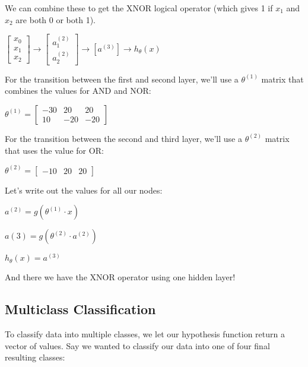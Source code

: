 \documentclass{article}
\begin{document}
We can combine these to get the XNOR logical operator (which gives 1 if $x_1$ and $x_2$ are both 0 or both 1).

$\left[\begin{matrix}
x_0 \\
x_1 \\
x_2
\end{matrix}\right]
\to
\left[ \begin{matrix}
a_1^{(2)} \\
a_2^{(2)}
\end{matrix}\right]
\to
\left[a^{(3)} \right]
\to 
h_{\theta}(x)
$

For the transition between the first and second layer, we'll use a $\theta^{(1)}$ matrix that combines the values for AND and NOR:

$\theta^{(1)}=
\left[\begin{matrix}
−30 & 20 & 20 \\
10  &−20 &−20
\end{matrix}\right]
$

For the transition between the second and third layer, we'll use a $\theta^{(2)}$ matrix that uses the value for OR:

$\theta^{(2)}=\left[\begin{matrix}−10 & 20 &20\end{matrix}\right]$

Let's write out the values for all our nodes:

$a^{(2)}=g(\theta^{(1)}\cdot x)$

$a(3)=g(\theta^{(2)} \cdot a^{(2)})$

$h_\theta(x)=a^{(3)}$

And there we have the XNOR operator using one hidden layer!
\subsection{Multiclass Classification}

To classify data into multiple classes, we let our hypothesis function return a vector of values. Say we wanted to classify our data into one of four final resulting classes:
\end{document}
